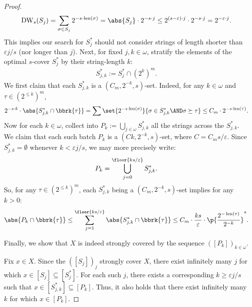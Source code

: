 \begin{proof}
    \begin{align*}
        \operatorname{DW}_s(S_j) = \sum_{\sigma \in S_j} 2^{- s \cdot \operatorname{len}(\sigma)} = \abs{S_j} \cdot 2^{-s \cdot j} \leq 2^{(s - \varepsilon) \cdot j} \cdot 2^{- s \cdot j} = 2^{- \varepsilon \cdot j}.
    \end{align*}
    This implies our search for $S^*_j$ should not consider strings of length shorter than $\varepsilon j / s$ (nor longer than $j$). Next, for fixed $j, k \in \omega$, stratify the elements of the optimal $s$-cover $S^*_j$ by their string-length $k$:
    \begin{align*}
        S^*_{j,k} := S^*_j \cap (2^{k})^m. 
    \end{align*}
    We first claim that each $S^*_{j,k}$ is a $(C_m, 2^{-k}, s)$-set. Indeed, for any $k \in \omega$ and $\tau \in (2^{\leq k})^m$, 
    \begin{align*}
        2^{-s \cdot k} \cdot \abs{S^*_{j,k} \cap \bbrk{\tau}} = \sum \set{2^{- s \cdot \operatorname{len}(\sigma)}}{\sigma \in S^*_{j, k} \AND \sigma \succeq \tau} \leq C_m \cdot 2^{-s \cdot \operatorname{len}(\tau)}.
    \end{align*}
    Now for each $k \in \omega$, collect into $P_k := \bigcup_{j \in \omega} S^*_{j, k}$ all the strings across the $S^*_{j, k}$. We claim that each such batch $P_k$ is a $(C k, 2^{-k}, s)$-set, where $C = C_m s / \varepsilon$. Since $S^*_{j, k} = \emptyset$ whenever $k < \varepsilon j / s$, we may more precisely write:
    \begin{align*}
        P_k = \bigcup_{j = 0}^{\floor{ks / \varepsilon}} S^*_{j, k}. 
    \end{align*}
    So, for any $\tau \in (2^{\leq k})^m$, each $S^*_{j, k}$ being a $(C_m, 2^{-k}, s)$-set implies for any $k > 0$:
    \begin{align*}
        \abs{P_k \cap \bbrk{\tau}} \leq \sum_{j = 1}^{\floor{ks / \varepsilon}} \abs{S^*_{j, k} \cap \bbrk{\tau}} \leq C_m \cdot \frac{ks}{\varepsilon} \cdot \p{\frac{2^{-\operatorname{len}(\tau)}}{2^{-k}}}^s. 
    \end{align*}
    
    Finally, we show that $X$ is indeed strongly covered by the sequence $([P_k])_{k \in \omega}$. 
    
    Fix $x \in X$. Since the $([S_j])_j$ strongly cover $X$, there exist infinitely many $j$ for which $x \in [S_j] \subseteq [S^*_j]$. For each such $j$, there exists a corresponding $k \geq \varepsilon j / s$ such that $x \in [S^*_{j, k}] \subseteq [P_k]$. Thus, it also holds that there exist infinitely many $k$ for which $x \in [P_k] $. 
\end{proof}

